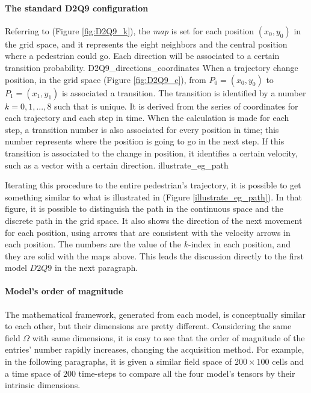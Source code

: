\documentclass[class=article, crop=false]{standalone}
\begin{document}
\paragraph{The standard D2Q9 configuration}
Referring to (Figure \ref{fig:D2Q9_k}), the \emph{map} is set for each position $(x_0, y_0)$ in the grid space, and it represents the eight neighbors and the central position where a pedestrian could go. 
Each direction will be associated to a certain transition probability. 
	{D2Q9_directions_coordinates}
When a trajectory change position, in the grid space (Figure \ref{fig:D2Q9_c}), from $P_0=(x_0, y_0)$ to $P_1=(x_1, y_1)$ is associated a transition. 
The transition is identified by a number $k = 0,1,...,8$ such that is unique. 
It is derived from the series of coordinates for each trajectory and each step in time. 
When the calculation is made for each step, a transition number is also associated for every position in time; this number represents where the position is going to go in the next step.
If this transition is associated to the change in position, it identifies a certain velocity, such as a vector with a certain direction. 
	{illustrate_eg_path}

Iterating this procedure to the entire pedestrian’s trajectory, it is possible to get something similar to what is illustrated in (Figure \ref{illustrate_eg_path}). 
In that figure, it is possible to distinguish the path in the continuous space and the discrete path in the grid space. 
It also shows the direction of the next movement for each position, using arrows that are consistent with the velocity arrows in each position. 
The numbers are the value of the $k$-index in each position, and they are solid with the maps above. 
This leads the discussion directly to the first model $D2Q9$ in the next paragraph.


\paragraph{Model's order of magnitude}
The mathematical framework, generated from each model, is conceptually similar to each other, but their dimensions are pretty different. 
Considering the same field $\Omega$ with same dimensions, it is easy to see that the order of magnitude of the entries’ number rapidly increases, changing the acquisition method.
For example, in the following paragraphs, it is given a similar field space of $200\times100$ cells and a time space of $200$ time-steps to compare all the four model’s tensors by their intrinsic dimensions.
\end{document}
